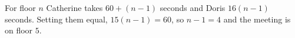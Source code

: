 For floor $n$ Catherine takes $60+(n-1)$ seconds and Doris $16(n-1)$ seconds. Setting them equal, $15(n-1)=60$, so $n-1=4$ and the meeting is on floor $\boxed{5}$.
